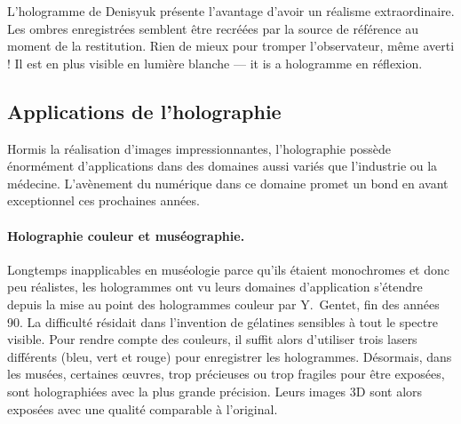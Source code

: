 L'hologramme de Denisyuk présente l'avantage d'avoir un réalisme extraordinaire.
Les ombres enregistrées semblent être recréées par la source de référence au
moment de la restitution. Rien de mieux pour tromper l'observateur, même averti !
Il est en plus visible en lumière blanche --- it is a hologramme en réflexion.

\subsection{Applications de l'holographie}
Hormis la réalisation d'images impressionnantes, l'holographie possède
énormément d'applications dans des domaines aussi variés que l'industrie ou la
médecine. L'avènement du numérique dans ce domaine promet un bond en avant
exceptionnel ces prochaines années.

\paragraph{Holographie couleur et muséographie.}
Longtemps inapplicables en muséologie parce qu'ils étaient monochromes et donc
peu réalistes, les hologrammes ont vu leurs domaines d'application s'étendre
depuis la mise au point des hologrammes couleur par Y.\ Gentet, fin des années
90. La difficulté résidait dans l'invention de gélatines sensibles à tout le
spectre visible. Pour rendre compte des couleurs, il suffit alors d'utiliser
trois lasers différents (bleu, vert et rouge) pour enregistrer les hologrammes.
Désormais, dans les musées, certaines œuvres, trop précieuses ou trop fragiles
pour être exposées, sont holographiées avec la plus grande précision. Leurs
images 3D sont alors exposées avec une qualité comparable à l'original.

